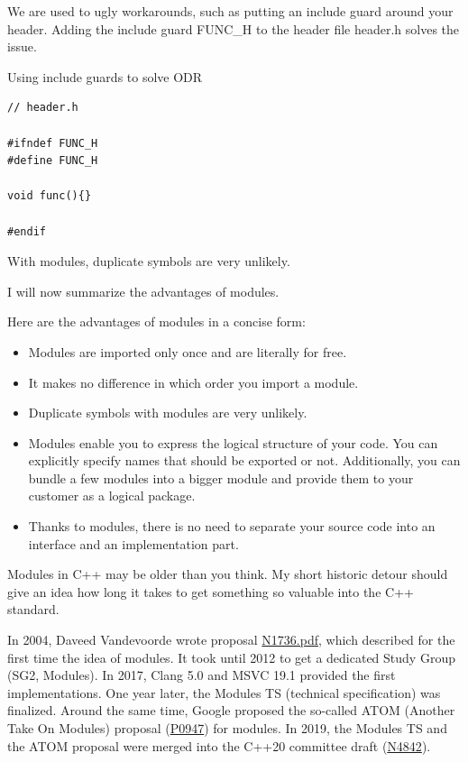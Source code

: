We are used to ugly workarounds, such as putting an include guard around your header. Adding the include guard FUNC\_H to the header file header.h solves the issue.

\noindent
Using include guards to solve ODR
\begin{lstlisting}[style=styleCXX]
// header.h

#ifndef FUNC_H
#define FUNC_H

void func(){}

#endif
\end{lstlisting}

With modules, duplicate symbols are very unlikely.

I will now summarize the advantages of modules.


Here are the advantages of modules in a concise form:

\begin{itemize}
\item 
Modules are imported only once and are literally for free.

\item 
It makes no difference in which order you import a module.

\item 
Duplicate symbols with modules are very unlikely.

\item 
Modules enable you to express the logical structure of your code. You can explicitly specify names that should be exported or not. Additionally, you can bundle a few modules into a bigger module and provide them to your customer as a logical package.

\item 
Thanks to modules, there is no need to separate your source code into an interface and an implementation part.
\end{itemize}

\begin{tcolorbox}[colback=blue!5!white,colframe=blue!75!black,title=Regular Types]
Modules in C++ may be older than you think. My short historic detour should give an idea how long it takes to get something so valuable into the C++ standard.

In 2004, Daveed Vandevoorde wrote proposal \href{http://www.open-std.org/jtc1/sc22/wg21/docs/papers/2004/n1736.pdf}{N1736.pdf}, which described for the first time the idea of modules. It took until 2012 to get a dedicated Study Group (SG2, Modules). In 2017, Clang 5.0 and MSVC 19.1 provided the first implementations. One year later, the Modules TS (technical specification) was finalized. Around the same time, Google proposed the so-called ATOM (Another Take On Modules) proposal (\href{http://www.open-std.org/jtc1/sc22/wg21/docs/papers/2018/p0947r1.html}{P0947}) for modules. In 2019, the Modules TS and the ATOM proposal were merged into the C++20 committee draft (\href{https://github.com/cplusplus/draft/releases/tag/n4842}{N4842}).
\end{tcolorbox}


